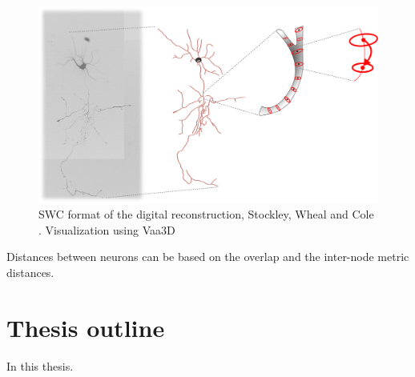 \begin{figure}
	\begin{center}
		\includegraphics[width=\textwidth]{ch1_fig5}
	\end{center}
	\vspace{-3ex}
	\caption{SWC format of the digital reconstruction, Stockley, Wheal and Cole \cite{stockley1993system}. Visualization using Vaa3D \cite{peng2010automatic}}
	\vspace{-1ex}
	\label{ch1__fig5}
\end{figure}

Distances between neurons can be based on the overlap and the inter-node metric distances.

\section{Thesis outline}
In this thesis.
